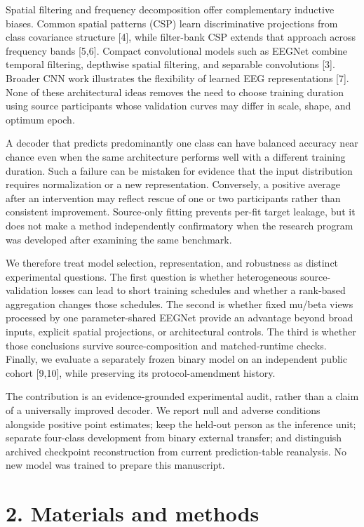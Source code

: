 \documentclass[11pt]{article}
\begin{document}
Spatial filtering and frequency decomposition offer complementary inductive biases. Common spatial patterns (CSP) learn discriminative projections from class covariance structure [4], while filter-bank CSP extends that approach across frequency bands [5,6]. Compact convolutional models such as EEGNet combine temporal filtering, depthwise spatial filtering, and separable convolutions [3]. Broader CNN work illustrates the flexibility of learned EEG representations [7]. None of these architectural ideas removes the need to choose training duration using source participants whose validation curves may differ in scale, shape, and optimum epoch.

A decoder that predicts predominantly one class can have balanced accuracy near chance even when the same architecture performs well with a different training duration. Such a failure can be mistaken for evidence that the input distribution requires normalization or a new representation. Conversely, a positive average after an intervention may reflect rescue of one or two participants rather than consistent improvement. Source-only fitting prevents per-fit target leakage, but it does not make a method independently confirmatory when the research program was developed after examining the same benchmark.

We therefore treat model selection, representation, and robustness as distinct experimental questions. The first question is whether heterogeneous source-validation losses can lead to short training schedules and whether a rank-based aggregation changes those schedules. The second is whether fixed mu/beta views processed by one parameter-shared EEGNet provide an advantage beyond broad inputs, explicit spatial projections, or architectural controls. The third is whether those conclusions survive source-composition and matched-runtime checks. Finally, we evaluate a separately frozen binary model on an independent public cohort [9,10], while preserving its protocol-amendment history.

The contribution is an evidence-grounded experimental audit, rather than a claim of a universally improved decoder. We report null and adverse conditions alongside positive point estimates; keep the held-out person as the inference unit; separate four-class development from binary external transfer; and distinguish archived checkpoint reconstruction from current prediction-table reanalysis. No new model was trained to prepare this manuscript.

\section*{2. Materials and methods}
\end{document}
